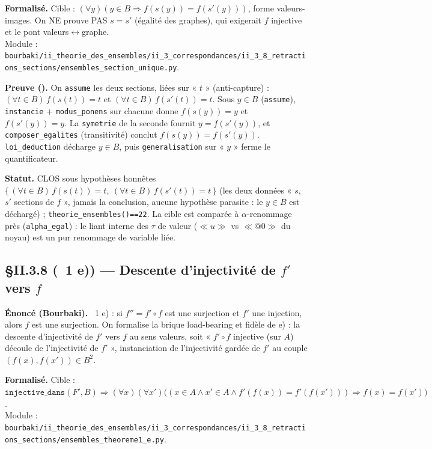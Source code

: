\textbf{Formalisé.} Cible : $(\forall y)(y \in B \Rightarrow f(s(y)) = f(s'(y)))$, forme valeurs-images. On NE prouve PAS $s = s'$ (égalité des graphes), qui exigerait $f$ injective et le pont valeurs$\leftrightarrow$graphe. \\
Module : \texttt{bourbaki/ii\_theorie\_des\_ensembles/ii\_3\_correspondances/ii\_3\_8\_retractions\_sections/ensembles\_section\_unique.py}.

\textbf{Preuve (\Nstar).} On \texttt{assume} les deux sections, liées sur « $t$ » (anti-capture) : $(\forall t\in B)\,f(s(t))=t$ et $(\forall t\in B)\,f(s'(t))=t$. Sous $y\in B$ (\texttt{assume}), \texttt{instancie} + \texttt{modus\_ponens} sur chacune donne $f(s(y))=y$ et $f(s'(y))=y$. La \texttt{symetrie} de la seconde fournit $y=f(s'(y))$, et \texttt{composer\_egalites} (transitivité) conclut $f(s(y))=f(s'(y))$. \texttt{loi\_deduction} décharge $y\in B$, puis \texttt{generalisation} sur « $y$ » ferme le quantificateur.

\textbf{Statut.} CLOS sous hypothèses honnêtes $\{\,(\forall t\in B)\,f(s(t))=t,\ (\forall t\in B)\,f(s'(t))=t\,\}$ (les deux données « $s$, $s'$ sections de $f$ », jamais la conclusion, aucune hypothèse parasite : le $y\in B$ est déchargé) ; \texttt{theorie\_ensembles()==22}. La cible est comparée à $\alpha$-renommage près (\texttt{alpha\_egal}) : le liant interne des $\tau$ de valeur ($\ll u \gg$ vs $\ll @0 \gg$ du noyau) est un pur renommage de variable liée.

\subsection{§II.3.8 (\theoreme~1 e)) --- Descente d'injectivité de $f'$ vers $f$}
\textbf{Énoncé (Bourbaki).} \theoreme~1 e) : si $f'' = f' \circ f$ est une surjection et $f'$ une injection, alors $f$ est une surjection. On formalise la brique load-bearing et fidèle de e) : la descente d'injectivité de $f'$ vers $f$ au sens valeurs, soit « $f' \circ f$ injective (sur $A$) découle de l'injectivité de $f'$ », instanciation de l'injectivité gardée de $f'$ au couple $(f(x), f(x')) \in B^2$.

\textbf{Formalisé.} Cible : $\texttt{injective\_dans}(F', B) \Rightarrow (\forall x)(\forall x')\bigl((x \in A \wedge x' \in A \wedge f'(f(x)) = f'(f(x'))) \Rightarrow f(x) = f(x')\bigr)$. \\
Module : \texttt{bourbaki/ii\_theorie\_des\_ensembles/ii\_3\_correspondances/ii\_3\_8\_retractions\_sections/ensembles\_theoreme1\_e.py}.


